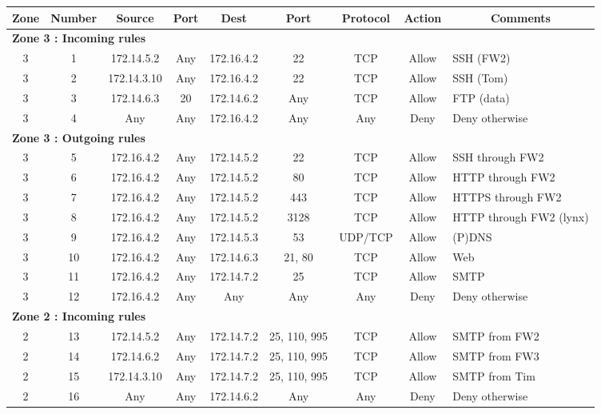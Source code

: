 \documentclass[a4paper,titlepage]{article}
\begin{document}
\begin{table}[h]
	\centering
	\small
	\begin{tabular}{c|c|cc|cc|ccl}
		Zone & Number & Source & Port & Dest & Port & Protocol & Action & \multicolumn{1}{c}{Comments}\\
		\hline
		\multicolumn{9}{l}{\textbf{Zone 3 : Incoming rules}}\\
		3 & 1 & 172.14.5.2 & Any & 172.16.4.2 & 22 & TCP & Allow & SSH (FW2)\\
		3 & 2 & 172.14.3.10 & Any & 172.16.4.2 & 22 & TCP & Allow & SSH (Tom)\\
		3 & 3 & 172.14.6.3 & 20 & 172.14.6.2 & Any & TCP & Allow & FTP (data)\\
		3 & 4 & Any & Any & 172.16.4.2 & Any & Any & Deny & Deny otherwise\\

		\hline
		\multicolumn{9}{l}{\textbf{Zone 3 : Outgoing rules}}\\
		3 & 5 & 172.16.4.2 & Any & 172.14.5.2 & 22 & TCP & Allow & SSH through FW2\\
		3 & 6 & 172.16.4.2 & Any & 172.14.5.2 & 80 & TCP & Allow & HTTP through FW2\\
		3 & 7 & 172.16.4.2 & Any & 172.14.5.2 & 443 & TCP & Allow & HTTPS through FW2\\
		3 & 8 & 172.16.4.2 & Any & 172.14.5.2 & 3128 & TCP & Allow & HTTP through FW2 (lynx) \\
		3 & 9 & 172.16.4.2 & Any & 172.14.5.3 & 53 & UDP/TCP & Allow & (P)DNS\\
		3 & 10 & 172.16.4.2 & Any & 172.14.6.3 & 21, 80 & TCP & Allow & Web\\
		3 & 11 & 172.16.4.2 & Any & 172.14.7.2 & 25 & TCP & Allow & SMTP\\
		3 & 12 & 172.16.4.2 & Any & Any & Any & Any & Deny & Deny otherwise\\

		\hline
		\multicolumn{9}{l}{\textbf{Zone 2 : Incoming rules}}\\
		2 & 13 & 172.14.5.2 & Any & 172.14.7.2 & 25, 110, 995 & TCP & Allow & SMTP from FW2\\
		2 & 14 & 172.14.6.2 & Any & 172.14.7.2 & 25, 110, 995 & TCP & Allow & SMTP from FW3\\
		2 & 15 & 172.14.3.10 & Any & 172.14.7.2 & 25, 110, 995 & TCP & Allow & SMTP from Tim\\
		2 & 16 & Any & Any & 172.14.6.2 & Any & Any & Deny & Deny otherwise\\


\end{tabular}
\end{table}
\end{document}
